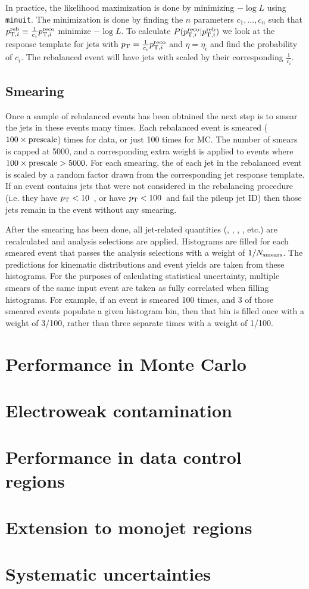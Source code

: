 In practice, the likelihood maximization is done by minimizing $-\log L$ using \texttt{minuit}.
The minimization is done by finding the $n$ parameters $c_1,\dots,c_n$ such that
$p_{\mathrm{T},i}^{\mathrm{reb}}\equiv\frac{1}{c_i}p_{\mathrm{T},i}^{\mathrm{reco}}$ minimize $-\log L$. To calculate
$P(p_{\mathrm{T},i}^{\mathrm{reco}}|p_{\mathrm{T},i}^{\mathrm{reb}})$ we look at the response template for jets with $p_{\mathrm{T}}=\frac{1}{c_i}p_{\mathrm{T},i}^{\mathrm{reco}}$
and $\eta=\eta_i$ and find the probability of $c_i$. The rebalanced event will have jets with \pt
scaled by their corresponding $\frac{1}{c_i}$.

\subsection{Smearing}

Once a sample of rebalanced events has been obtained the next step is to smear the jets in these events many times. 
Each rebalanced event is smeared ($100 \times\mathrm{prescale}$) times for data, or just 100 times for MC.
The number of smears is capped at 5000, and a corresponding extra weight is applied to events where $100 \times\mathrm{prescale}>5000$.
For each smearing, the \pt of each jet in the rebalanced event is scaled by a random factor drawn from the corresponding jet response template. If an event
contains jets that were not considered in the rebalancing procedure (i.e. they have $p_{\mathrm{T}}<10$~\GeV, or have $p_{\mathrm{T}}<100$~\GeV and fail the pileup jet ID) 
then those jets remain in the event without any smearing. 

After the smearing has been done, all jet-related quantities (\Ht, \ptmiss, \mttwo, \dpmin, etc.) 
are recalculated and analysis selections are applied. Histograms are filled for each smeared event that passes the analysis
selections with a weight of $1/N_{\mathrm{smears}}$. The \rs predictions for kinematic distributions and event yields are taken from these histograms.
For the purposes of calculating statistical uncertainty, multiple smears of the same input event are taken as fully correlated when filling histograms. For example, if an event
is smeared 100 times, and 3 of those smeared events populate a given histogram bin, then that bin is filled once with a weight of 3/100, rather than three separate
times with a weight of 1/100.

\section{Performance in Monte Carlo}

\section{Electroweak contamination}

\section{Performance in data control regions}

\section{Extension to monojet regions}

\section{Systematic uncertainties}
